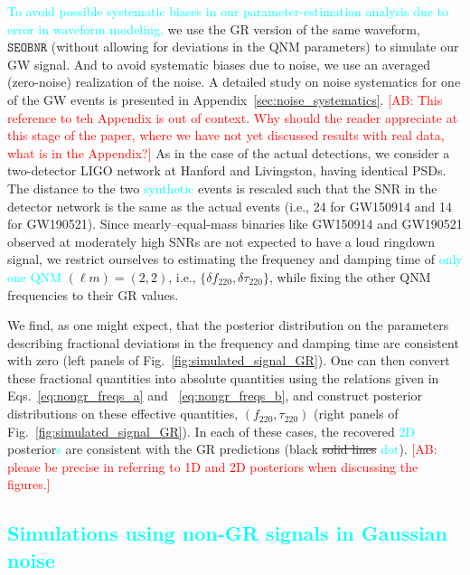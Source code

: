 \documentclass[twocolumn,prd,aps,superscriptaddress,preprintnumbers,tightenlines,showpacs,nofootinbib,eqsecnum,amsfonts,amsmath]{revtex4-1}
\newcommand{\ab}[1]{\textcolor{cyan}{#1}}
\newcommand{\comment}[1]{\textcolor{red}{[#1]}}
\newcommand{\df}[1]{\delta f_{\text{#1}}}
\newcommand{\dtau}[1]{\delta \tau_{\text{#1}}}
\newcommand{\fngr}[1]{f_{\text{#1}}}
\newcommand{\taungr}[1]{\tau_{\text{#1}}}
\newcommand{\SEOB}{\texttt{SEOBNR}}
\begin{document}

\ab{To avoid possible systematic biases in our parameter-estimation analysis 
due to error in waveform modeling,} we use the GR version of the same waveform,
$\SEOB$ (without allowing for deviations in the QNM parameters) to
simulate our GW signal. And to avoid systematic biases due to noise,
we use an averaged (zero-noise) realization of the noise. A detailed
study on noise systematics for one of the GW events is presented in
Appendix~\ref{sec:noise_systematics}. \comment{AB: This reference to teh Appendix is out of context. 
Why should the reader appreciate at this stage of the paper, where we have not yet 
discussed results with real data, what is in the Appendix?} As in the case of the actual
detections, we consider a two-detector LIGO network at
Hanford and Livingston, having identical PSDs. The distance to the two
\ab{synthetic} events is rescaled such that the SNR in the detector network
is the same as the actual events (i.e., 24 for GW150914 and 14 
for GW190521). Since mearly--equal-mass binaries like GW150914 and
GW190521 observed at moderately high SNRs are not expected to have a
loud ringdown signal, we restrict ourselves to estimating the
frequency and damping time of \ab{only one QNM} $(\ell m) = (2,2)$, i.e.,
$\{\df{220},\dtau{220}\}$, while fixing the other QNM frequencies to
their GR values.

We find, as one might expect, that the posterior distribution on the
parameters describing fractional deviations in the frequency and
damping time are consistent with zero (left panels of
Fig.~\ref{fig:simulated_signal_GR}). One can then convert these
fractional quantities into absolute quantities using the relations
given in Eqs.~\ref{eq:nongr_freqs_a} and ~\ref{eq:nongr_freqs_b}, and
construct posterior distributions on these effective quantities,
$(\fngr{220}, \taungr{220})$ (right panels of
Fig.~\ref{fig:simulated_signal_GR}). In each of these cases, the recovered
\ab{2D} posterior{\ab{s} are consistent with the GR predictions 
(black \sout{solid lines} \ab{dot}). \comment{AB: please be precise in referring 
to 1D and 2D posteriors when discussing the figures.}}


\subsection{\ab{Simulations using non-GR signals in Gaussian noise}} \label{ssec:ngr_signal}
\end{document}

